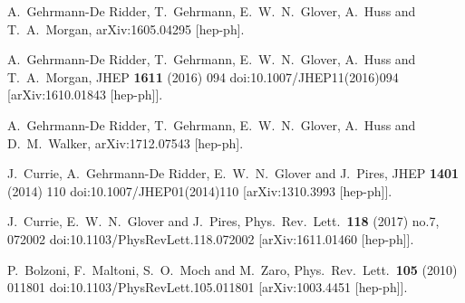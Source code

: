  A.~Gehrmann-De Ridder, T.~Gehrmann, E.~W.~N.~Glover, A.~Huss and T.~A.~Morgan,
  arXiv:1605.04295 [hep-ph].


  A.~Gehrmann-De Ridder, T.~Gehrmann, E.~W.~N.~Glover, A.~Huss and T.~A.~Morgan,
  JHEP {\bf 1611} (2016) 094
  doi:10.1007/JHEP11(2016)094
  [arXiv:1610.01843 [hep-ph]].

  A.~Gehrmann-De Ridder, T.~Gehrmann, E.~W.~N.~Glover, A.~Huss and D.~M.~Walker,
  arXiv:1712.07543 [hep-ph].



  J.~Currie, A.~Gehrmann-De Ridder, E.~W.~N.~Glover and J.~Pires,
  JHEP {\bf 1401} (2014) 110
  doi:10.1007/JHEP01(2014)110
  [arXiv:1310.3993 [hep-ph]].


  J.~Currie, E.~W.~N.~Glover and J.~Pires,
  Phys.\ Rev.\ Lett.\  {\bf 118} (2017) no.7,  072002
  doi:10.1103/PhysRevLett.118.072002
  [arXiv:1611.01460 [hep-ph]].


  P.~Bolzoni, F.~Maltoni, S.~O.~Moch and M.~Zaro,
  Phys.\ Rev.\ Lett.\  {\bf 105} (2010) 011801
  doi:10.1103/PhysRevLett.105.011801
  [arXiv:1003.4451 [hep-ph]].

